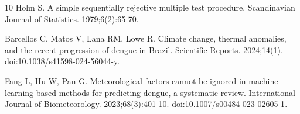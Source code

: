 \documentclass[10pt,letterpaper]{article}
\begin{document}
\begin{thebibliography}{10}
Holm S.
\newblock A simple sequentially rejective multiple test procedure.
\newblock Scandinavian Journal of Statistics. 1979;6(2):65-70.

Barcellos C, Matos V, Lana RM, Lowe R.
\newblock Climate change, thermal anomalies, and the recent progression of
  dengue in Brazil.
\newblock Scientific Reports. 2024;14(1).
\newblock \href {http://dx.doi.org/10.1038/s41598-024-56044-y}
  {doi:10.1038/s41598-024-56044-y}.

Fang L, Hu W, Pan G.
\newblock Meteorological factors cannot be ignored in machine learning-based
  methods for predicting dengue, a systematic review.
\newblock International Journal of Biometeorology. 2023;68(3):401-10.
\newblock \href {http://dx.doi.org/10.1007/s00484-023-02605-1}
  {doi:10.1007/s00484-023-02605-1}.

\end{thebibliography}
\end{document}

